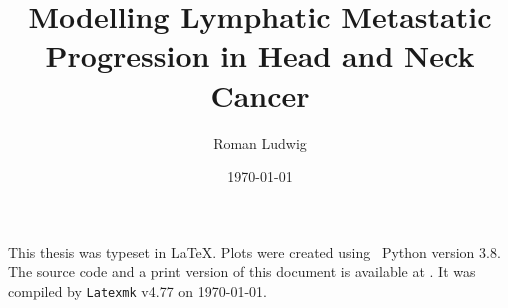 \documentclass[
    a4paper,
    12pt,
]{report}
\title{Modelling Lymphatic Metastatic Progression in Head and Neck Cancer}
\author{Roman Ludwig}
\date{\monthyeardate\today}
\begin{document}
    \pagestyle{empty}
    
    \pagestyle{plain}
    

    This thesis was typeset in \LaTeX. Plots were created using ~Python version 3.8. The source code and a print version of this document is available at . It was compiled by \texttt{Latexmk} v4.77 on \today.
\end{document}
